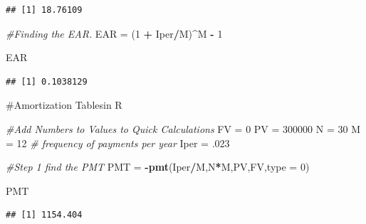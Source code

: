 \documentclass[]{article}
\newenvironment{Shaded}{\begin{snugshade}}{\end{snugshade}}
\newcommand{\CommentTok}[1]{\textcolor[rgb]{0.56,0.35,0.01}{\textit{#1}}}
\newcommand{\DataTypeTok}[1]{\textcolor[rgb]{0.13,0.29,0.53}{#1}}
\newcommand{\DecValTok}[1]{\textcolor[rgb]{0.00,0.00,0.81}{#1}}
\newcommand{\FloatTok}[1]{\textcolor[rgb]{0.00,0.00,0.81}{#1}}
\newcommand{\KeywordTok}[1]{\textcolor[rgb]{0.13,0.29,0.53}{\textbf{#1}}}
\newcommand{\NormalTok}[1]{#1}
\newcommand{\OperatorTok}[1]{\textcolor[rgb]{0.81,0.36,0.00}{\textbf{#1}}}
\newcommand{\StringTok}[1]{\textcolor[rgb]{0.31,0.60,0.02}{#1}}
\begin{document}
\begin{verbatim}
## [1] 18.76109
\end{verbatim}

\begin{Shaded}
\begin{Highlighting}[]
\CommentTok{#Finding the EAR.  }
\NormalTok{EAR =}\StringTok{ }\NormalTok{(}\DecValTok{1} \OperatorTok{+}\StringTok{ }\NormalTok{Iper}\OperatorTok{/}\NormalTok{M)}\OperatorTok{^}\NormalTok{M }\OperatorTok{-}\StringTok{ }\DecValTok{1}

\NormalTok{EAR}
\end{Highlighting}
\end{Shaded}

\begin{verbatim}
## [1] 0.1038129
\end{verbatim}

\#Amortization Tablesin R

\begin{Shaded}
\begin{Highlighting}[]
\CommentTok{#Add Numbers to Values to Quick Calculations}
\NormalTok{FV =}\StringTok{ }\DecValTok{0}
\NormalTok{PV =}\StringTok{ }\DecValTok{300000}
\NormalTok{N =}\StringTok{ }\DecValTok{30}
\NormalTok{M =}\StringTok{ }\DecValTok{12} \CommentTok{# frequency of payments per year}
\NormalTok{Iper =}\StringTok{ }\FloatTok{.023}


\CommentTok{#Step 1 find the PMT}
\NormalTok{PMT =}\StringTok{ }\OperatorTok{-}\KeywordTok{pmt}\NormalTok{(Iper}\OperatorTok{/}\NormalTok{M,N}\OperatorTok{*}\NormalTok{M,PV,FV,}\DataTypeTok{type =} \DecValTok{0}\NormalTok{)}

\NormalTok{PMT}
\end{Highlighting}
\end{Shaded}

\begin{verbatim}
## [1] 1154.404
\end{verbatim}
\end{document}
